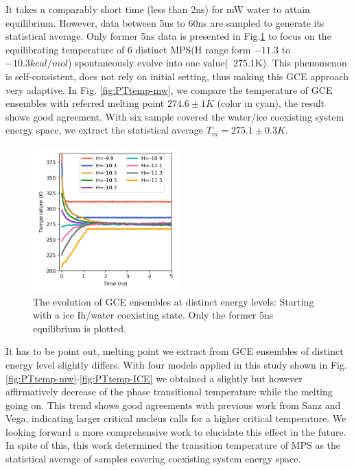 \documentclass[aps,prl,twocolumn,superscriptaddress]{revtex4-1}
\begin{document}
It takes a comparably short time (less than 2ns) for mW water to attain equilibrium. However, data between 5ns to 60ns are  sampled to generate its statistical average. Only former 5ns data is presented in Fig.\ref{fig:evolution} to focus on the equilibrating temperature of 6 distinct MPS(H range form $-11.3$ to $-10.3 kcal/mol$) spontaneously evolve into one value(~275.1K). This phenomenon is self-consistent, does not rely on initial setting, thus making this GCE approach very adaptive. In Fig. \ref{fig:PTtemp-mw}, we compare the temperature of GCE ensembles with referred melting point $274.6\pm 1K$  \cite{Molinero2009} (color in cyan), the result shows good agreement. With six sample covered the water/ice coexisting system energy space, we extract the statistical average $T_m=275.1\pm0.3K$.
\begin{figure}[ht]
\centering{}\includegraphics[width=0.5\textwidth]{PoteScan.png} 
\caption{The evolution of GCE ensembles at distinct energy levels: Starting with a ice Ih/water coexisting state. Only the former 5ns equilibrium is plotted.
\label{fig:evolution} }
\end{figure}
It has to be point out, melting point we extract from GCE ensembles of distinct energy level slightly differs. With four models applied in this study shown in Fig.\ref{fig:PTtemp-mw}-\ref{fig:PTtemp-ICE} we obtained a slightly but however affirmatively decrease of the phase transitional temperature while the melting going on. This trend shows good agreements with previous work from Sanz and Vega\cite{Sanz2013}, indicating larger critical nucleus calls for a higher critical temperature. We looking forward a more comprehensive work to elucidate this effect in the future. In spite of this, this work determined the transition temperature of MPS as the statistical average of samples covering coexisting system energy space.
\end{document}

